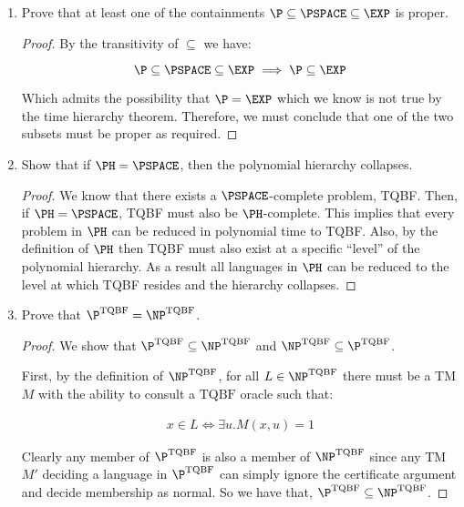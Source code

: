 \documentclass[usletter]{article}
\begin{document}
\begin{enumerate}
    \item Prove that at least one of the containments $\P \subseteq \PSPACE \subseteq \EXP$ is proper.

      \begin{proof}
        By the transitivity of $\subseteq$ we have:

        \begin{equation}
          \P \subseteq \PSPACE \subseteq \EXP \implies \P \subseteq \EXP
        \end{equation}

        Which admits the possibility that $\P = \EXP$ which we know is not true by the time hierarchy theorem. Therefore, we must conclude that one of the two subsets must be proper as required.
      \end{proof}

    \item Show that if $\PH = \PSPACE$, then the polynomial hierarchy collapses.

      \begin{proof}
        We know that there exists a $\PSPACE$-complete problem, TQBF. Then, if $\PH = \PSPACE$, TQBF must also be $\PH$-complete. This implies that every problem in $\PH$ can be reduced in polynomial time to TQBF. Also, by the definition of $\PH$ then TQBF must also exist at a specific ``level'' of the polynomial hierarchy. As a result all languages in $\PH$ can be reduced to the level at which TQBF resides and the hierarchy collapses.
      \end{proof}

    \item Prove that $\P^{\text{TQBF}} = \NP^{\text{TQBF}}$.

      \begin{proof}
        We show that $\P^{\text{TQBF}} \subseteq \NP^{\text{TQBF}}$ and $\NP^{\text{TQBF}} \subseteq \P^{\text{TQBF}}$.

        First, by the definition of $\NP^{\text{TQBF}}$, for all $L \in \NP^{\text{TQBF}}$ there must be a TM $M$ with the ability to consult a $\text{TQBF}$ oracle such that:

      \begin{align}
        x \in L \iff \exists u.M(x,u) = 1
      \end{align}

      Clearly any member of $\P^{\text{TQBF}}$ is also a member of $\NP^{\text{TQBF}}$ since any TM $M'$ deciding a language in $\P^{\text{TQBF}}$ can simply ignore the certificate argument and decide membership as normal. So we have that, $\P^{\text{TQBF}} \subseteq \NP^{\text{TQBF}}$.


\end{proof}
\end{enumerate}
\end{document}
